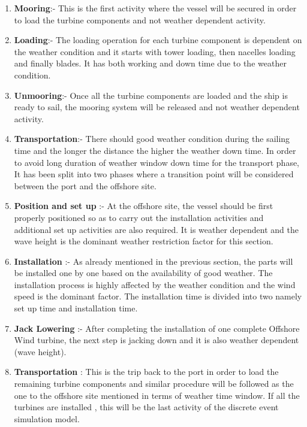 \begin{enumerate}
\item \textbf{Mooring}:- This is the first activity where the vessel will be secured in order to load the turbine components and not weather dependent activity.
\item \textbf{Loading}:- The loading operation for each turbine component is dependent on the weather condition and it starts with tower loading, then nacelles loading and finally blades. It has both working and down time due to the weather condition.
\item \textbf{Unmooring}:- Once all the turbine components are loaded and the ship is ready to sail, the mooring system will be released and not weather dependent activity.
\item \textbf{Transportation}:- There should good weather condition during the sailing time and the longer the distance the higher the weather down time. In order to avoid long duration of weather window down time  for the transport phase, It has been split into two phases where a transition point will be considered between the port and the offshore site.
\item \textbf{Position and set up} :- At the offshore site, the vessel should be first properly positioned so as to carry out the installation activities and  additional set up activities are also required. It is weather dependent and the wave height is the dominant weather restriction factor for this section.

\item \textbf{Installation} :- As already mentioned in the previous section, the parts will be installed one by one based on the availability of good weather. The installation process is highly affected by the weather condition and the wind speed is the dominant factor. The installation time is  divided into two namely set up time and installation time. 
\item \textbf{Jack Lowering} :- After completing the installation of one complete Offshore Wind turbine, the next step is jacking down and it is also weather dependent (wave height).
\item \textbf{Transportation} : This is the trip back to the port in order to load the remaining turbine components and similar procedure will be followed as the one to the offshore site mentioned in terms of weather time window. If all the turbines are installed , this will be the last activity of the discrete event simulation model.

\end{enumerate}